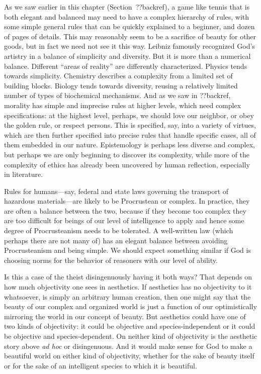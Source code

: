 As we saw earlier in this chapter (Section~??backref), a game like tennis that is both elegant and balanced may need 
to have a complex hierarchy of rules, with some simple general rules that can be quickly explained to a beginner, and 
dozen of pages of details. This may reasonably seem to be a sacrifice of beauty for other goods, but in fact we need not see it this way. Leibniz famously recognized God's artistry in a balance of simplicity and diversity. But it is more than a numerical balance. Different ``areas of reality'' are differently characterized. Physics tends towards simplicity. Chemistry describes a complexity from 
a limited set of building blocks. Biology tends towards diversity, reusing a relatively limited number of types of biochemical 
mechanisms. And as we saw in ??backref, morality has simple and imprecise rules at higher levels, which need complex 
specifications: at the highest level, perhaps, we should love our neighbor, or obey the golden rule, or respect persons. This 
is specified, say, into a variety of virtues, which are then further specified into precise rules that handle specific cases,
all of them embedded in our nature. Epistemology is perhaps less diverse and complex, but perhaps we are only beginning to 
discover its complexity, while more of the complexity of ethics has already been uncovered by human reflection, especially in literature. 

Rules for humans---say, federal and state laws governing the transport of hazardous materials---are likely to be
Procrustean or complex. In practice, they are often a balance between the two, because if they become too complex
they are too difficult for beings of our level of intelligence to apply and hence some degree of Procrusteanism 
needs to be tolerated. A well-written law (which perhaps there are not many of) has an elegant balance between
avoiding Procrusteanism and being simple. We should expect something similar if God is choosing norms for the
behavior of reasoners with our level of ability.

Is this a case of the theist disingenuously having it both ways? That depends on how much objectivity one sees in aesthetics.
If aesthetics has no objectivity to it whatsoever, is simply an arbitrary human creation, then one might say that the beauty 
of our complex and organized world is just a function of our optimistically mirroring the world in our concept of beauty.
But aesthetics could have one of two kinds of objectivity: it could be objective and species-independent or it could be 
objective and species-dependent. On neither kind of objectivity is the aesthetic story above \textit{ad hoc} or disingenuous.
And it would make sense for God to make a beautiful world on either kind of objectivity, whether for the sake of beauty itself
or for the sake of an intelligent species to which it is beautiful.

